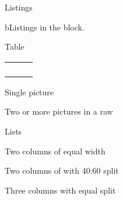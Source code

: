 \begin{frame}[fragile]{Listings}
\label{listings}
\begin{block}{bListings in the block. }
\label{blistings-in-the-block.-beamer}
\begin{Shaded}
\begin{Highlighting}[]
 
 
\end{Highlighting}
\end{Shaded}
\end{block}
\end{frame}

\begin{frame}{Table}
\label{table}
\begin{longtable}[]{@{}lrc@{}}
\toprule\noalign{}
& & \\
\midrule\noalign{}
\endhead
& & \\
& & \\
& & \\
\bottomrule\noalign{}
\end{longtable}
\end{frame}

\begin{frame}{Single picture}
\label{single-picture}
\begin{figure}
\centering
\caption{}
\end{figure}
\end{frame}

\begin{frame}{Two or more pictures in a raw}
\label{two-or-more-pictures-in-a-raw}
\end{frame}

\begin{frame}{Lists}
\label{lists}
\end{frame}

\begin{frame}{Two columns of equal width}
\label{two-columns-of-equal-width}
\end{frame}

\begin{frame}{Two columns of with 40:60 split}
\label{two-columns-of-with-4060-split}
\end{frame}

\begin{frame}{Three columns with equal split}
\label{three-columns-with-equal-split}
\end{frame}


